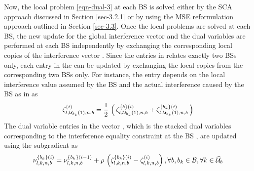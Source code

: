 Now, the local problem \eqref{eqn-dual-3} at each \ac{BS}  is solved either by the \ac{SCA} approach discussed in Section \ref{sec-3.2.1} or by using the \ac{MSE} reformulation approach outlined in Section \ref{sec-3.3}. Once the local problems are solved at each \ac{BS}, the new update for the global interference vector  and the dual variables  are performed at each \ac{BS} independently by exchanging the corresponding local copies of the interference vector . Since the entries in  relates exactly two \acp{BS} only, each entry in the  can be updated by exchanging the local copies from the corresponding two \acp{BS} only. For instance, the entry  depends on the local interference value  assumed by the \ac{BS}  and the actual interference caused by the \ac{BS}  as in  as
\begin{equation}
\zeta_{l,\mc{U}_{b_k}(1),n,b}^{(i)} = \frac{1}{2} \, \left ( \, \zeta^{\set{b}(i)}_{l,\mc{U}_{b_k}(1),n,b} + \zeta^{\set{b_k}(i)}_{l,\mc{U}_{b_k}(1),n,b} \, \right )
\label{zeta_update}
\end{equation}
The dual variable entries in the vector , which is the stacked dual variables corresponding to the interference equality constraint at the \ac{BS} , are updated using the subgradient as
\begin{equation}\label{dual-sg-update}
\nu^{\set{b_k}(i)}_{l,k,n,b} = \nu^{\set{b_k}(i-1)}_{l,k,n,b} + \rho \, \left (\zeta^{\set{b_k}(i)}_{l,k,n,b} - \zeta^{(i)}_{l,k,n,b} \right ), \forall b,b_k \in \mc{B}, \forall k \in \bar{\mc{U}}_{b}
\end{equation}

